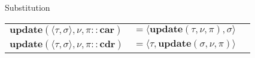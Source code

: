\documentclass{article}
\newcommand{\pairtype}[2]{\langle #1 , #2 \rangle}
\newcommand{\update}[3]{\mathbf{update}(#1, #2, #3)}
\begin{document}
\begin{figure}
\begin{tabular}{l  l  r}
\end{tabular}

\caption{Substitution}

\end{figure}

\begin{figure}
  \begin{tabular}{l l r}
    $ \update{\pairtype{ \tau }{ \sigma }}{\nu}{\pi :: \mathbf{car}} $ 
      & $ = \pairtype{\update{\tau}{\nu}{\pi}}{\sigma} $ & \\
    $ \update{\pairtype{ \tau }{ \sigma }}{\nu}{\pi :: \mathbf{cdr}} $ 
      & $ = \pairtype{\tau}{\update{\sigma}{\nu}{\pi}} $ & \\
    
  \end{tabular}
\end{figure}
\end{document}

